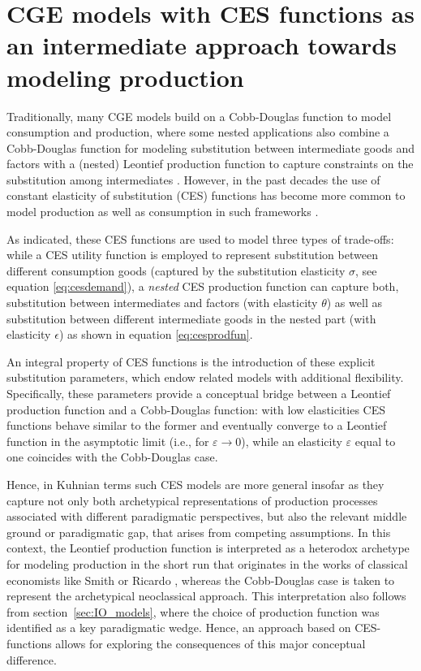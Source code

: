 
\section{CGE models with CES functions as an intermediate approach towards modeling production} \label{sec:ces}

Traditionally, many CGE models build on a Cobb-Douglas function to model consumption and production, where some nested applications also combine a Cobb-Douglas function for modeling substitution between intermediate goods and factors with a (nested) Leontief production function to capture constraints on the substitution among intermediates \citep[e.g.][]{GAMS.IO}. However, in the past decades the use of constant elasticity of substitution (CES) functions has become more common to model production as well as consumption in such frameworks \citep{Taylor1990,Klump.2012,Kim.2017}.

As indicated, these CES functions are used to model three types of trade-offs: while a CES utility function is employed to represent substitution between different consumption goods (captured by the substitution elasticity $\sigma$, see equation \eqref{eq:cesdemand}), a \textit{nested} CES production function can capture both, substitution between intermediates and factors (with elasticity $\theta$) as well as substitution between different intermediate goods in the nested part (with elasticity $\epsilon$) as shown in equation \eqref{eq:cesprodfun}.

An integral property of CES functions is the introduction of these explicit substitution parameters, which endow related models with additional flexibility. Specifically, these parameters provide a conceptual bridge between a Leontief production function and a Cobb-Douglas function: with low elasticities CES functions behave similar to the former and eventually converge to a Leontief function in the asymptotic limit (i.e., for $\varepsilon \to 0$), while an elasticity $\varepsilon$ equal to one coincides with the Cobb-Douglas case.

Hence, in Kuhnian terms such CES models are more general insofar as they capture not only both archetypical representations of production processes associated with different paradigmatic perspectives, but also the relevant middle ground or paradigmatic gap, that arises from competing assumptions. In this context, the Leontief production function is interpreted as a heterodox archetype for modeling production in the short run that originates in the works of classical economists like Smith or Ricardo \citep[e.g.][]{Blecker2019}, whereas the Cobb-Douglas case is taken to represent the archetypical neoclassical approach. This interpretation also follows from section~\ref{sec:IO_models}, where the choice of production function was identified as a key paradigmatic wedge. Hence, an approach based on CES-functions allows for exploring the consequences of this major conceptual difference.

